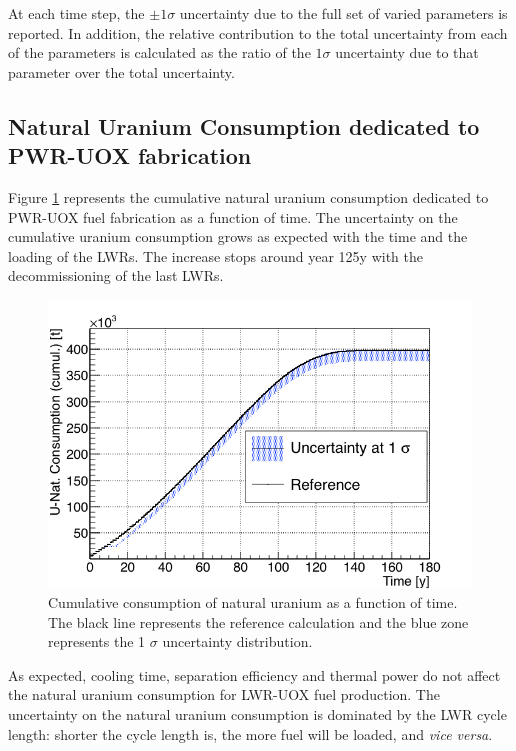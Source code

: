 \documentclass{anstrans}
\begin{document}
At each time step, the $\pm1\sigma$ uncertainty due to the full set of varied
parameters is reported.  In addition, the relative contribution to the total
uncertainty from each of the parameters is calculated as the ratio of the
$1\sigma$ uncertainty due to that parameter over the total uncertainty.

\subsection{Natural Uranium Consumption dedicated to PWR-UOX fabrication}

Figure \ref{fig:unat_full} represents the cumulative natural uranium consumption
dedicated to PWR-UOX fuel fabrication as a function of time.  The uncertainty on
the cumulative uranium consumption grows as expected with the time and the
loading of the \glspl{LWR}.  The increase stops around year 125y with the
decommissioning of the last \glspl{LWR}.

\begin{figure}[t] %
    \centering
    \includegraphics[scale=0.3]{unat_full}
    \caption{Cumulative consumption of natural uranium as a function of time.  The black line
        represents the reference calculation and the blue zone
        represents the 1 $\sigma$ uncertainty distribution.}\label{fig:unat_full}
\end{figure}


As expected, cooling time, separation efficiency and thermal power do not
affect the natural uranium consumption for LWR-UOX fuel production.  The uncertainty on the natural uranium
consumption is dominated by the \gls{LWR} cycle length: shorter the cycle
length is, the more fuel will be loaded, and \emph{vice versa}.
\end{document}
